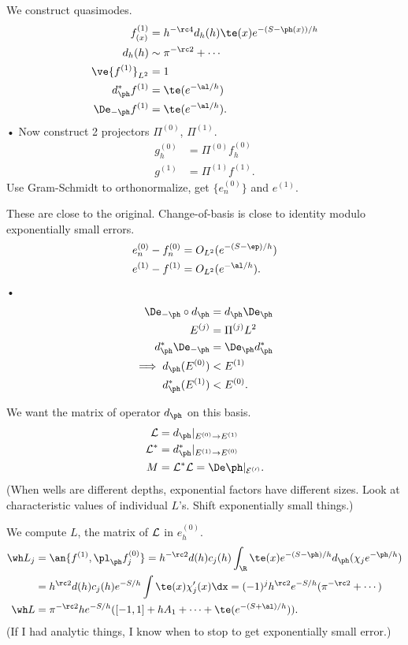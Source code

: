 We construct quasimodes.
\begin{align}
f_{(x)}^{(1)} &= h^{-\rc 4} d_h(h)\te(x) e^{-(S-\ph(x))/h}\\
d_h(h)&\sim \pi^{-\rc 2}+\cdots\\
\ve{f^{(1)}}_{L^2} &=1\\
d_\ph^* f^{(1)} &= \te(e^{-\al/h})\\
\De_{-\ph} f^{(1)} &=\te(e^{-\al/h}).
\end{align}•
Now construct 2 projectors $\Pi^{(0)}$, $\Pi^{(1)}$. 
\begin{align}
g_h^{(0)}  &= \Pi^{(0)} f_h^{(0)}\\
g^{(1)} &= \Pi^{(1)} f^{(1)} .
\end{align}
Use Gram-Schmidt to orthonormalize, get $\{e_n^{(0)}\}$ and $e^{(1)}$.  

These are close to the original. Change-of-basis is close to identity modulo exponentially small errors. 
\begin{align}
e_n^{(0)} - f_n^{(0)} &=O_{L^2} (e^{-(S-\ep)/h})\\
e^{(1)} - f^{(1)} &= O_{L^2} (e^{-\al/h}).
\end{align}•
\begin{align}
\De_{-\ph} \circ d_\ph &= d_\ph\De_\ph\\
E^{(j)}&=\Pi^{(j)} L^2\\
d_\ph^*\De_{-\ph} &= \De_\ph d_\ph^*\\
\implies
d_\ph(E^{(0)}) &< E^{(1)}\\
d_\ph^*(E^{(1)}) &< E^{(0)}.
\end{align}

We want the matrix of operator $d_\ph$ on this basis.
\begin{align}
\cal L &= d_\ph |_{E^{(0)}\to E^{(1)}}\\
\cal L^* &= d_\ph^*|_{E^{(1)}\to E^{(0)}}\\
M&=\cal L^*\cal L = \De \ph|_{E^{(0)}}.
\end{align}
(When wells are different depths, exponential factors have different sizes. Look at characteristic values of individual $L$'s. Shift exponentially small things.)

We compute $L$, the matrix of $\cal L$ in $e_h^{(0)}$.
\begin{align}
\wh L_j &= \an{f^{(1)}, \pl_\ph f_j^{(0)}} = h^{-\rc 2} d(h) c_j(h) \int_\R \te(x) e^{-(S-\ph)/h} d_\ph(\chi_j e^{-\ph/h})\\
&=h^{\rc 2} d(h)c_j(h)  e^{-S/h} \int \te(x)\chi_j'(x)\dx = (-1)^j h^{\rc 2} e^{-S/h} (\pi^{-\rc 2}+\cdots)\\
\wh L &=\pi^{-\rc 2}he^{-S/h}  ([-1,1]+ hA_1+\cdots  + \te(e^{-(S+\al)/h})).
\end{align}
(If I had analytic things, I know when to stop to get exponentially small error.)

